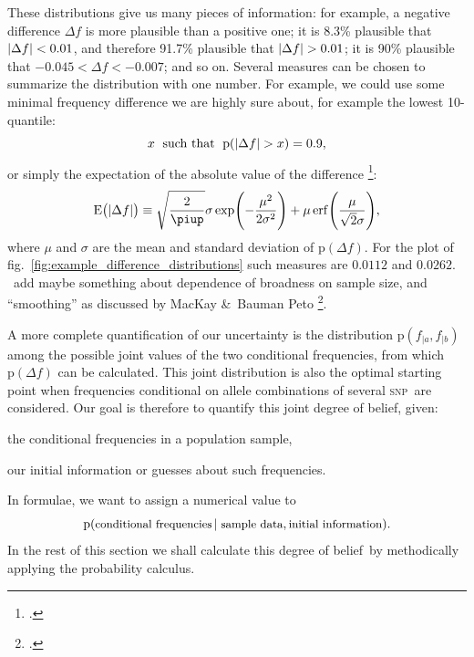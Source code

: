 \documentclass[\ifafour a4paper,12pt,\else a5paper,10pt,\fi%
onecolumn,oneside,article,%
british%
]{memoir}
\theoremstyle{remark}
\theoremstyle{innote}
\newcommand*{\citep}{\footcites}
\newcommand*{\citey}{\footcites}
\newcommand*{\amp}{\&}
\newcommand*{\pu}{\piup}%
\DeclarePairedDelimiter\abs{\lvert}{\rvert}
\newcommand*{\pf}{\mathrm{p}}%
\newcommand*{\E}{\mathrm{E}}
\renewcommand*{\|}[1][]{\nonscript\,#1\vert\nonscript\;\mathopen{}}
\newcommand*{\sect}{\S}%
\newcommand*{\fig}{fig.}%
\newcommand*{\puzzle}{{\fontencoding{U}\fontfamily{fontawesometwo}\selectfont\symbol{225}}}
\newcommand{\mynote}[1]{ {\color{notecolour}\puzzle\ #1}}
\newcommand*{\dob}{degree of belief}
\DeclareMathOperator{\erf}{erf}
\newcommand*{\ptext}[1]{\text{\small #1}}
\newcommand*{\snp}{\textsc{snp}}
\newcommand*{\ya}{a}
\newcommand*{\yb}{b}
\newcommand*{\df}{\Delta f}
\begin{document}
These distributions give us many pieces of information: for example, a
negative difference $\df$ is more plausible than a positive one; it is
8.3\% plausible that $\abs{\df}<0.01$, and therefore 91.7\% plausible that
$\abs{\df}>0.01$; it is 90\% plausible that $-0.045 < \df < -0.007$; and so
on. Several measures can be chosen to summarize the distribution with one
number. For example, we could use some minimal frequency difference we are
highly sure about, for example the lowest 10-quantile:
\begin{equation}\label{eq:significance_measure}
x\;\text{ such that }\; \pf(\abs{\df} > x)=0.9,
\end{equation}
or simply the expectation of the absolute value of the difference
\citep{leoneetal1961}:
\begin{equation}\label{eq:significance_measure_expabs}
\E\bigl(\abs{\df}\bigr) \equiv \sqrt{\frac{2}{\pu}}\sigma\exp\Biggl(-\frac{\mu^2}{2\sigma^2} \Biggr) + \mu \erf\Biggl( \frac{\mu}{\sqrt{2}\sigma} \Biggr),
\end{equation}
where $\mu$ and $\sigma$ are the mean and standard deviation of $\pf(\df)$.
For the plot of \fig~\ref{fig:example_difference_distributions} such
measures are $0.0112$ and $0.0262$.
\mynote{add maybe something about dependence of broadness on sample size, and
  \enquote{smoothing} as discussed by MacKay \amp\ Bauman Peto
  \citey[\sect~2.6]{mackayetal1995}.}

A more complete quantification of our uncertainty is the distribution
$\pf(f_{|\ya}, f_{|\yb})$ among the possible joint values of the two
conditional frequencies, from which $\pf(\df)$ can be calculated. This
joint distribution is also the optimal starting point when frequencies
conditional on allele combinations of several \snp\ are considered. Our
goal is therefore to quantify this joint \dob, given:
\begin{enumerate*}[label=(\arabic*)]
\item the conditional frequencies in a population sample, \item our initial
  information or guesses about such frequencies.
\end{enumerate*} In formulae, we want to assign a numerical value to
\begin{equation}\label{eq:p_goal}
  \pf(\ptext{conditional frequencies} \|
  \ptext{sample data}, \ptext{initial information}).
\end{equation}
In the rest of this section we shall calculate this \dob\ by methodically
applying the probability calculus.
\end{document}
